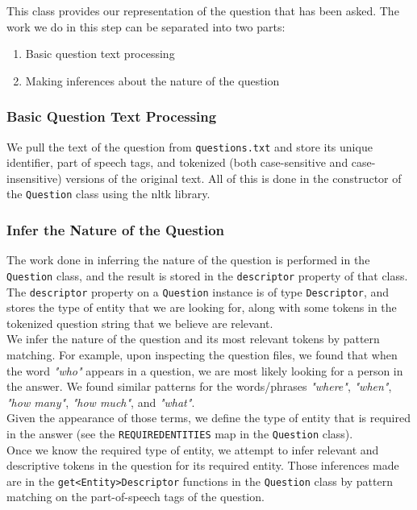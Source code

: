 \documentclass{article}
\begin{document}
This class provides our representation of the question that has been asked. The work we do in this step can be separated into two parts:
\begin{enumerate}
\item Basic question text processing
\item Making inferences about the nature of the question
\end{enumerate}

\subsubsection{Basic Question Text Processing}
We pull the text of the question from \texttt{questions.txt} and store its unique identifier, part of speech tags, and tokenized (both case-sensitive and case-insensitive) versions of the original text. All of this is done in the constructor of the \texttt{Question} class using the nltk library.

\subsubsection{Infer the Nature of the Question}
The work done in inferring the nature of the question is performed in the \texttt{Question} class, and the result is stored in the \texttt{descriptor} property of that class. The \texttt{descriptor} property on a \texttt{Question} instance is of type \texttt{Descriptor}, and stores the type of entity that we are looking for, along with some tokens in the tokenized question string that we believe are relevant.\\

We infer the nature of the question and its most relevant tokens by pattern matching. For example, upon inspecting the question files, we found that when the word \textit{"who"} appears in a question, we are most likely looking for a person in the answer. We found similar patterns for the words/phrases \textit{"where"},  \textit{"when"},  \textit{"how many"},  \textit{"how much"}, and  \textit{"what"}.\\

Given the appearance of those terms, we define the type of entity that is required in the answer (see the \texttt{REQUIREDENTITIES} map in the \texttt{Question} class).\\

Once we know the required type of entity, we attempt to infer relevant and descriptive tokens in the question for its required entity. Those inferences made are in the \texttt{get\textless Entity\textgreater Descriptor} functions in the \texttt{Question} class by pattern matching on the part-of-speech tags of the question.\\
\end{document}
